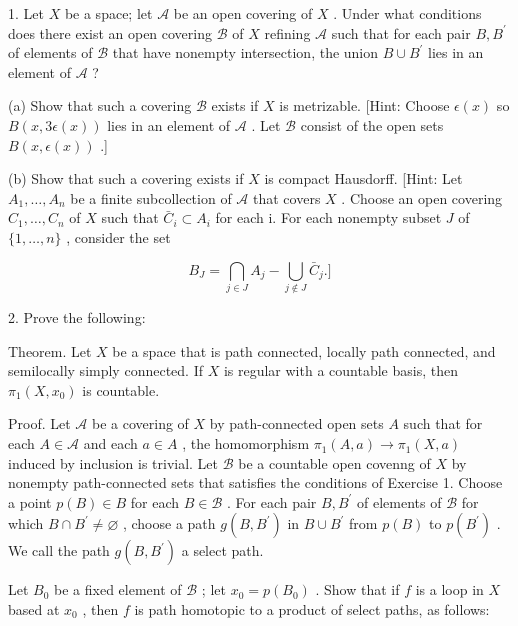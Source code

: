 \documentclass[10pt]{article}
\begin{document}
1. Let \(X\) be a space; let \(\mathcal{A}\) be an open covering of \(X\) . Under what conditions does there exist an open covering \(\mathcal{B}\) of \(X\) refining \(\mathcal{A}\) such that for each pair \(B,{B}^{\prime }\) of elements of \(\mathcal{B}\) that have nonempty intersection, the union \(B \cup  {B}^{\prime }\) lies in an element of \(\mathcal{A}\) ?

(a) Show that such a covering \(\mathcal{B}\) exists if \(X\) is metrizable. [Hint: Choose \(\epsilon \left( x\right)\) so \(B\left( {x,{3\epsilon }\left( x\right) }\right)\) lies in an element of \(\mathcal{A}\) . Let \(\mathcal{B}\) consist of the open sets \(B\left( {x,\epsilon \left( x\right) }\right)\) .]

(b) Show that such a covering exists if \(X\) is compact Hausdorff. [Hint: Let \({A}_{1},\ldots ,{A}_{n}\) be a finite subcollection of \(\mathcal{A}\) that covers \(X\) . Choose an open covering \({C}_{1},\ldots ,{C}_{n}\) of \(X\) such that \({\bar{C}}_{i} \subset  {A}_{i}\) for each i. For each nonempty subset \(J\) of \(\{ 1,\ldots ,n\}\) , consider the set

\[
{B}_{J} = \mathop{\bigcap }\limits_{{j \in  J}}{A}_{j} - \mathop{\bigcup }\limits_{{j \notin  J}}{\bar{C}}_{j}.\rbrack
\]

2. Prove the following:

Theorem. Let \(X\) be a space that is path connected, locally path connected, and semilocally simply connected. If \(X\) is regular with a countable basis, then \({\pi }_{1}\left( {X,{x}_{0}}\right)\) is countable.

Proof. Let \(\mathcal{A}\) be a covering of \(X\) by path-connected open sets \(A\) such that for each \(A \in  \mathcal{A}\) and each \(a \in  A\) , the homomorphism \({\pi }_{1}\left( {A,a}\right)  \rightarrow  {\pi }_{1}\left( {X,a}\right)\) induced by inclusion is trivial. Let \(\mathcal{B}\) be a countable open covenng of \(X\) by nonempty path-connected sets that satisfies the conditions of Exercise 1. Choose a point \(p\left( B\right)  \in  B\) for each \(B \in  \mathcal{B}\) . For each pair \(B,{B}^{\prime }\) of elements of \(\mathcal{B}\) for which \(B \cap  {B}^{\prime } \neq  \varnothing\) , choose a path \(g\left( {B,{B}^{\prime }}\right)\) in \(B \cup  {B}^{\prime }\) from \(p\left( B\right)\) to \(p\left( {B}^{\prime }\right)\) . We call the path \(g\left( {B,{B}^{\prime }}\right)\) a select path.

Let \({B}_{0}\) be a fixed element of \(\mathcal{B}\) ; let \({x}_{0} = p\left( {B}_{0}\right)\) . Show that if \(f\) is a loop in \(X\) based at \({x}_{0}\) , then \(f\) is path homotopic to a product of select paths, as follows:
\end{document}
